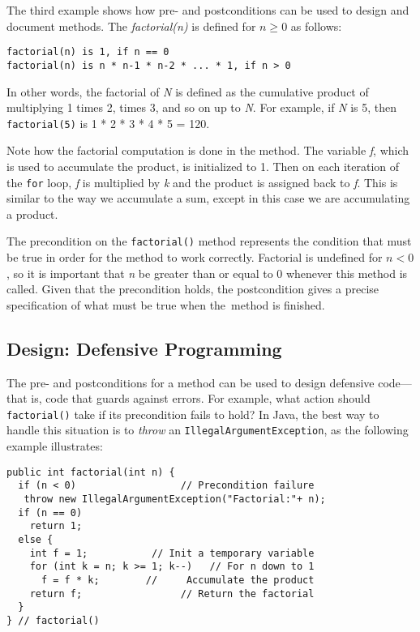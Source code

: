 The third example shows how pre- and postconditions can be used
to design and document methods. The {\it factorial(n)} is defined
for $ n \geq 0 $ as follows:


\begin{jjjlisting}
\begin{lstlisting}
factorial(n) is 1, if n == 0
factorial(n) is n * n-1 * n-2 * ... * 1, if n > 0
\end{lstlisting}
\end{jjjlisting}

\noindent In other words, the factorial of {\it N} is defined as
the cumulative product of multiplying 1 times 2, times 3, and so on up
to {\it N}.  For example, if {\it N} is 5, then {\tt factorial(5)} is 1 * 2 * 3 *
4 * 5 = 120.


Note how the factorial computation is done in the method.  The
variable {\it f}, which is used to accumulate the product, is
initialized to 1. Then on each iteration of the {\tt for} loop, {\it f} is
multiplied by {\it k} and the product is assigned back to {\it f}.
This is similar to the way we accumulate a sum, except in this case we
are accumulating a product.




The precondition on the {\tt factorial()} method represents the
condition that must be true in order for the method to work
correctly. Factorial is undefined for $n < 0$, so it is important that
{\it n} be greater than or equal to 0 whenever this method is called. Given
that the precondition holds, the postcondition gives a precise
specification of what must be true when the~method is finished.

\subsection*{Design: Defensive Programming}
\noindent The pre- and postconditions for a method can be used to design
defensive code---that is, code that guards against errors. For
example, what action should {\tt factorial()} take if its precondition
fails to hold?  In Java, the best way to handle this situation is to
{\em throw} an {\tt IllegalArgumentException}, as the following example
illustrates:

\begin{jjjlisting}
\begin{lstlisting}
public int factorial(int n) {
  if (n < 0)                  // Precondition failure
   throw new IllegalArgumentException("Factorial:"+ n);
  if (n == 0)
    return 1;
  else {
    int f = 1;           // Init a temporary variable
    for (int k = n; k >= 1; k--)   // For n down to 1
      f = f * k;        //     Accumulate the product
    return f;                 // Return the factorial
  }
} // factorial()
\end{lstlisting}
\end{jjjlisting}

